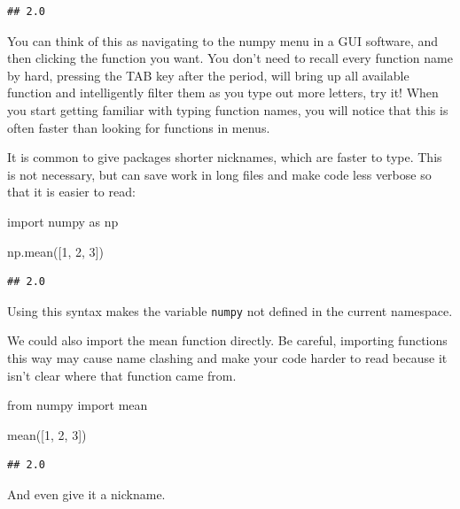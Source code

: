 \documentclass[]{Nemilov}
\newenvironment{Shaded}{\begin{snugshade}}{\end{snugshade}}
\newcommand{\DecValTok}[1]{\textcolor[rgb]{0.00,0.00,0.81}{#1}}
\newcommand{\ImportTok}[1]{#1}
\newcommand{\NormalTok}[1]{#1}
\begin{document}
\begin{verbatim}
## 2.0
\end{verbatim}

You can think of this as navigating to the numpy menu in a GUI software, and
then clicking the function you want. You don't need to recall every function
name by hard, pressing the TAB key after the period, will bring up
all available function and intelligently filter them as you type out more
letters, try it! When you start getting familiar with typing function names,
you will notice that this is often faster than looking for functions in menus.

It is common to give packages shorter nicknames, which are faster to type. This
is not necessary, but can save work in long files and make code less verbose so
that it is easier to read:

\begin{Shaded}
\begin{Highlighting}[]
\ImportTok{import}\NormalTok{ numpy }\ImportTok{as}\NormalTok{ np}

\NormalTok{np.mean([}\DecValTok{1}\NormalTok{, }\DecValTok{2}\NormalTok{, }\DecValTok{3}\NormalTok{])}
\end{Highlighting}
\end{Shaded}

\begin{verbatim}
## 2.0
\end{verbatim}

Using this syntax makes the variable \texttt{numpy} not defined in the current namespace.

We could also import the mean function directly. Be careful, importing functions
this way may cause name clashing and make your code harder to read because it isn't
clear where that function came from.

\begin{Shaded}
\begin{Highlighting}[]
\ImportTok{from}\NormalTok{ numpy }\ImportTok{import}\NormalTok{ mean}

\NormalTok{mean([}\DecValTok{1}\NormalTok{, }\DecValTok{2}\NormalTok{, }\DecValTok{3}\NormalTok{])}
\end{Highlighting}
\end{Shaded}

\begin{verbatim}
## 2.0
\end{verbatim}

And even give it a nickname.
\end{document}
